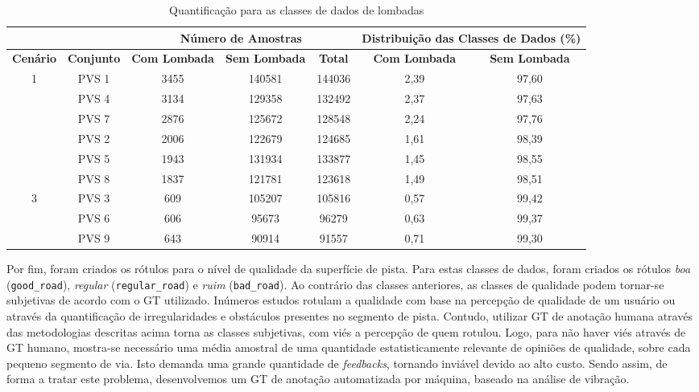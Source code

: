 \begin{table}[H]
\scriptsize
\centering
\caption{Quantificação para as classes de dados de lombadas} 
\label{table:lombada_metricas}
\begin{tabular}{ccccccc}
\cmidrule(l){3-7}
\multicolumn{1}{l}{} & 
\multicolumn{1}{l}{} & 
\multicolumn{3}{c}{\textbf{Número de Amostras}} & 
\multicolumn{2}{c}{\textbf{Distribuição das Classes de Dados (\%)}} \\ \midrule
\textbf{Cenário} & 
\textbf{Conjunto} & 
\textbf{Com Lombada} & 
\textbf{Sem Lombada} & 
\textbf{Total} & 
\textbf{Com Lombada} & 
\textbf{Sem Lombada} \\ \midrule

\multirow{4}{*}{1} & PVS 1 & 3455 & 140581 & 144036 & 2,39 & 97,60 \\ \cmidrule(l){2-7} 
 & PVS 4 & 3134 & 129358 & 132492 & 2,37 & 97,63 \\ \cmidrule(l){2-7} 
 & PVS 7 & 2876 & 125672 & 128548 & 2,24 & 97,76 \\ \midrule
 
\multirow{4}{*}{2} & PVS 2 & 2006 & 122679 & 124685 & 1,61 & 98,39 \\ \cmidrule(l){2-7} 
 & PVS 5 & 1943 & 131934 & 133877 & 1,45 & 98,55 \\ \cmidrule(l){2-7} 
 & PVS 8 & 1837 & 121781 & 123618 & 1,49 & 98,51 \\ \midrule
 
\multirow{4}{*}{3} & PVS 3 & 609 & 105207 & 105816 & 0,57 & 99,42 \\ \cmidrule(l){2-7} 
 & PVS 6 & 606 & 95673 & 96279 & 0,63 & 99,37 \\ \cmidrule(l){2-7} 
 & PVS 9 & 643 & 90914 & 91557 & 0,71 & 99,30 \\ \bottomrule
\end{tabular}
\end{table}

Por fim, foram criados os rótulos para o nível de qualidade da superfície de pista. Para estas classes de dados, foram criados os rótulos \emph{boa} (\texttt{good\_road}), \emph{regular} (\texttt{regular\_road}) e \emph{ruim} (\texttt{bad\_road}). Ao contrário das classes anteriores, as classes de qualidade podem tornar-se subjetivas de acordo com o GT utilizado. Inúmeros estudos rotulam a qualidade com base na percepção de qualidade de um usuário ou através da quantificação de irregularidades e obstáculos presentes no segmento de pista. Contudo, utilizar GT de anotação humana através das metodologias descritas acima torna as classes subjetivas, com viés a percepção de quem rotulou. Logo, para não haver viés através de GT humano, mostra-se necessário uma média amostral de uma quantidade estatisticamente relevante de opiniões de qualidade, sobre cada pequeno segmento de via. Isto demanda uma grande quantidade de \textit{feedbacks}, tornando inviável devido ao alto custo. Sendo assim, de forma a tratar este problema, desenvolvemos um GT de anotação automatizada por máquina, baseado na análise de vibração.

